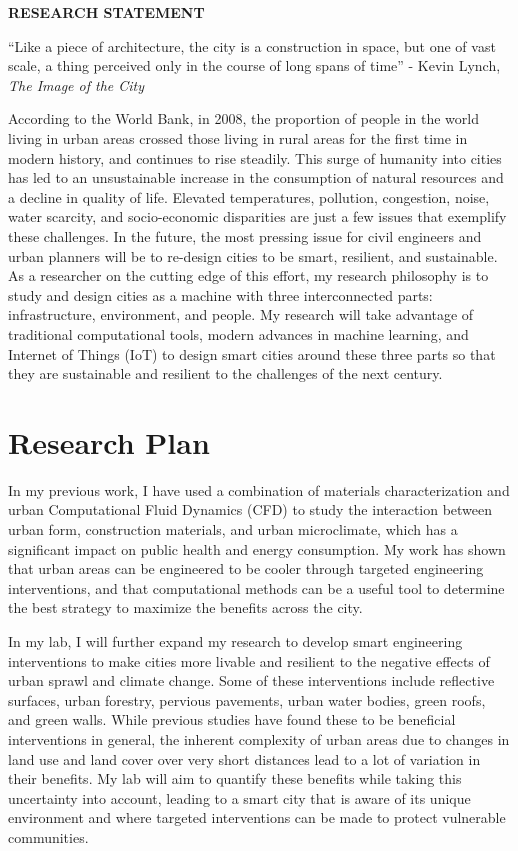 \documentclass[12pt]{article}
\begin{document}
 \sloppy %

\begin{center}
{\large \uppercase{\textbf{Research Statement}}}
\end{center}

``Like a piece of architecture, the city is a construction in space, but one of vast scale, a thing perceived only in the course of long spans of time'' - Kevin Lynch, \textit{The Image of the City }

According to the World Bank, in 2008, the proportion of people in the world living in urban areas crossed those living in rural areas for the first time in modern history, and continues to rise steadily. This surge of humanity into cities has led to an unsustainable increase in the consumption of natural resources and a decline in quality of life. Elevated temperatures, pollution, congestion, noise, water scarcity, and socio-economic disparities are just a few issues that exemplify these challenges. In the future, the most pressing issue for civil engineers and urban planners will be to re-design cities to be smart, resilient, and sustainable. As a researcher on the cutting edge of this effort, my research philosophy is to study and design cities as a machine with three interconnected parts: infrastructure, environment, and people. My research will take advantage of traditional computational tools, modern advances in machine learning, and Internet of Things (IoT) to design smart cities around these three parts so that they are sustainable and resilient to the challenges of the next century.

\section*{Research Plan}
In my previous work, I have used a combination of materials characterization and urban Computational Fluid Dynamics (CFD) to study the interaction between urban form, construction materials, and urban microclimate, which has a significant impact on public health and energy consumption. My work has shown that urban areas can be engineered to be cooler through targeted engineering interventions, and that computational methods can be a useful tool to determine the best strategy to maximize the benefits across the city. 

In my lab, I will further expand my research to develop smart engineering interventions to make cities more livable and resilient to the negative effects of urban sprawl and climate change. Some of these interventions include reflective surfaces, urban forestry, pervious pavements, urban water bodies, green roofs, and green walls. While previous studies have found these to be beneficial interventions in general, the inherent complexity of urban areas due to changes in land use and land cover over very short distances lead to a lot of variation in their benefits. My lab will aim to quantify these benefits while taking this uncertainty into account, leading to a smart city that is aware of its unique environment and where targeted interventions can be made to protect vulnerable communities.
\end{document}
